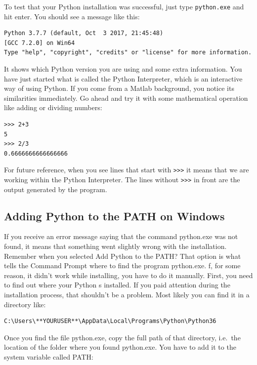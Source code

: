 To test that your Python installation was successful, just type \texttt{python.exe} and hit enter. You should see a message like this:

\begin{verbatim}
Python 3.7.7 (default, Oct  3 2017, 21:45:48)
[GCC 7.2.0] on Win64
Type "help", "copyright", "credits" or "license" for more information.
\end{verbatim}

It shows which Python version you are using and some extra information. You have just started what is called the Python Interpreter, which is an interactive way of using Python. If you come from a Matlab background, you notice its similarities immediately. Go ahead and try it with some mathematical operation like adding or dividing numbers:

\begin{verbatim}
>>> 2+3
5
>>> 2/3
0.6666666666666666
\end{verbatim}

For future reference, when you see lines that start with \texttt{>>>} it means that we are working within the Python Interpreter. The lines without \texttt{>>>} in front are the output generated by the program.

\subsection{Adding Python to the PATH on Windows}\label{subsec:path-windows}
If you receive an error message saying that the command python.exe was not found, it means that something went slightly wrong with the installation. Remember when you selected Add Python to the PATH? That option is what tells the Command Prompt where to find the program python.exe. f, for some reason, it didn't work while installing, you have to do it manually. First, you need to find out where your Python s installed. If you paid attention during the installation process, that shouldn't be a problem. Most likely you can find it in a directory like:

\begin{verbatim}
C:\Users\**YOURUSER**\AppData\Local\Programs\Python\Python36
\end{verbatim}

Once you find the file python.exe, copy the full path of that directory, i.e.\ the location of the folder where you found python.exe. You have to add it to the system variable called PATH:

